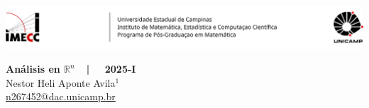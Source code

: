 \documentclass[a4paper, 11pt]{article}
\begin{document}

\-\vspace{-0.3in} 

\par\noindent \includegraphics[width = \textwidth]{Imagens/Header.png} 


\begin{center} %
{\Large\textbf{Análisis en \(\mathbb{R}^n\)\ \ | \ \  2025-I}} \vspace{0.1in}   \\ {\small
Nestor Heli Aponte Avila\(^1\) \\ 
\href{mailto:n267452@dac.unicamp.br}{\url{n267452@dac.unicamp.br}}} %

\end{center} %


\theoremstyle{definition}
\newtheorem*{definition}{}

\theoremstyle{plain}
\newtheorem*{lemma}{{\scriptsize \(\square\)}}
\newtheorem*{proposition}{{\large \(\square\)}}
\newtheorem*{theorem}{{\large \(\blacksquare\)}} 

\makeatletter
\def\@thm@headpunct{} %

\def\th@plain{%
  \thm@headpunct{} %
}

\def\th@definition{%
  \thm@headpunct{} %
}
\end{document}

